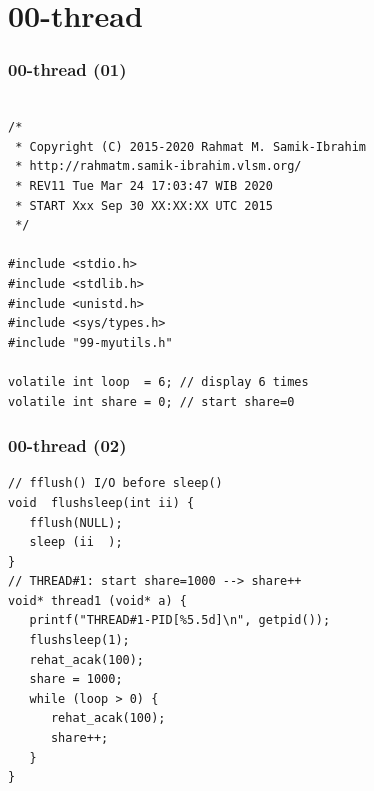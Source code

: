\documentclass[aspectratio=169, xcolor=table, notheorems, hyperref={pdfpagelabels=false}]{beamer}
\begin{document}
\section{00-thread}
\begin{frame}[fragile]
\frametitle{00-thread (01)}
\begin{lstlisting}[basicstyle=\ttfamily\small]        %  65
% \begin{lstlisting}[basicstyle=\ttfamily\large]        %  54

/*
 * Copyright (C) 2015-2020 Rahmat M. Samik-Ibrahim
 * http://rahmatm.samik-ibrahim.vlsm.org/
 * REV11 Tue Mar 24 17:03:47 WIB 2020
 * START Xxx Sep 30 XX:XX:XX UTC 2015
 */

#include <stdio.h>
#include <stdlib.h>
#include <unistd.h>
#include <sys/types.h>
#include "99-myutils.h"

volatile int loop  = 6; // display 6 times
volatile int share = 0; // start share=0

\end{lstlisting}
\end{frame}

\begin{frame}[fragile]
\frametitle{00-thread (02)}
\begin{lstlisting}[basicstyle=\ttfamily\large]        %  54
// fflush() I/O before sleep() 
void  flushsleep(int ii) {
   fflush(NULL);
   sleep (ii  );
}
// THREAD#1: start share=1000 --> share++
void* thread1 (void* a) {
   printf("THREAD#1-PID[%5.5d]\n", getpid());
   flushsleep(1);
   rehat_acak(100);
   share = 1000;
   while (loop > 0) {
      rehat_acak(100);
      share++;
   }
}

\end{lstlisting}
\end{frame}
\end{document}
